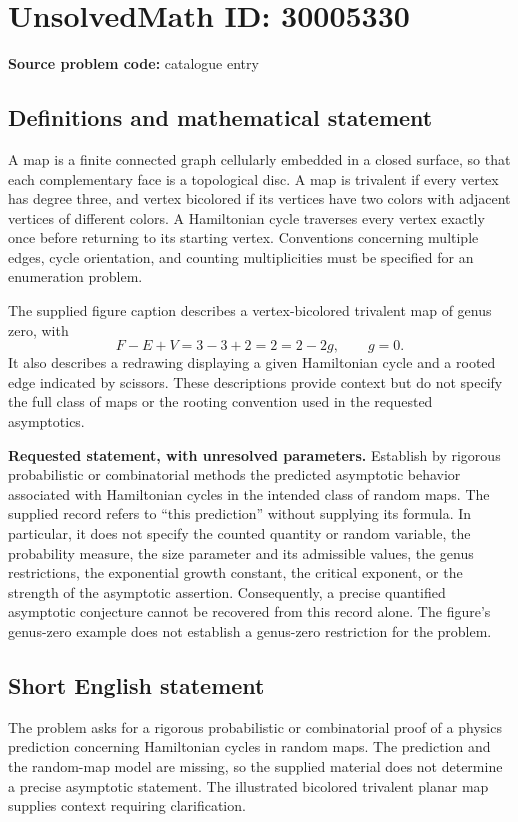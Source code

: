 \documentclass[11pt]{article}
\begin{document}
\section*{UnsolvedMath ID: 30005330}
\textbf{Source problem code:} catalogue entry
\subsection{Definitions and mathematical statement}
A map is a finite connected graph cellularly embedded in a closed surface, so that each complementary face is a topological disc. A map is trivalent if every vertex has degree three, and vertex bicolored if its vertices have two colors with adjacent vertices of different colors. A Hamiltonian cycle traverses every vertex exactly once before returning to its starting vertex. Conventions concerning multiple edges, cycle orientation, and counting multiplicities must be specified for an enumeration problem.

The supplied figure caption describes a vertex-bicolored trivalent map of genus zero, with
\[
F-E+V=3-3+2=2=2-2g,\qquad g=0.
\]
It also describes a redrawing displaying a given Hamiltonian cycle and a rooted edge indicated by scissors. These descriptions provide context but do not specify the full class of maps or the rooting convention used in the requested asymptotics.

\textbf{Requested statement, with unresolved parameters.} Establish by rigorous probabilistic or combinatorial methods the predicted asymptotic behavior associated with Hamiltonian cycles in the intended class of random maps. The supplied record refers to ``this prediction'' without supplying its formula. In particular, it does not specify the counted quantity or random variable, the probability measure, the size parameter and its admissible values, the genus restrictions, the exponential growth constant, the critical exponent, or the strength of the asymptotic assertion. Consequently, a precise quantified asymptotic conjecture cannot be recovered from this record alone. The figure's genus-zero example does not establish a genus-zero restriction for the problem.
\subsection{Short English statement}
The problem asks for a rigorous probabilistic or combinatorial proof of a physics prediction concerning Hamiltonian cycles in random maps. The prediction and the random-map model are missing, so the supplied material does not determine a precise asymptotic statement. The illustrated bicolored trivalent planar map supplies context requiring clarification.
\end{document}
